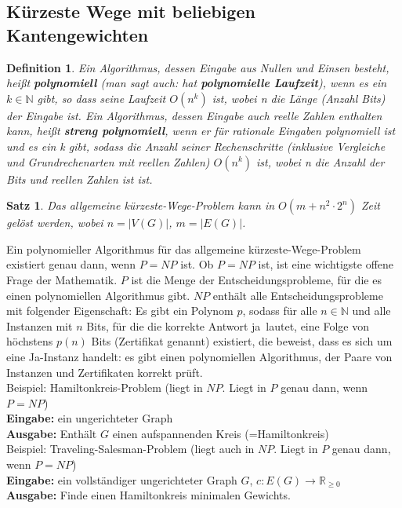 \documentclass[12pt,a4paper]{article}
\theoremstyle{plain}
\newtheorem{Satz}[Theorem]{Satz}
\newtheorem{Definition}[Theorem]{Definition}
\newcommand{\herv}[1]{{\emph{\textbf{#1}}}}
\newcommand{\N}{\mathbb{N}}
\newcommand{\R}{\mathbb{R}}
\numberwithin{equation}{section}
\begin{document}
\subsection{Kürzeste Wege mit beliebigen Kantengewichten}
\begin{Definition}
Ein Algorithmus, dessen Eingabe aus Nullen und Einsen besteht, heißt \herv{polynomiell} (man sagt auch: hat \herv{polynomielle Laufzeit}), wenn es ein $k\in \N$ gibt, so dass seine Laufzeit $O(n^k)$ ist, wobei n die Länge (Anzahl Bits) der Eingabe ist. Ein Algorithmus, dessen Eingabe auch reelle Zahlen enthalten kann, heißt \herv{streng polynomiell}, wenn er für rationale Eingaben polynomiell ist und es ein k gibt, sodass die Anzahl seiner Rechenschritte (inklusive Vergleiche und Grundrechenarten mit reellen Zahlen) $O(n^k)$ ist, wobei n die Anzahl der Bits und reellen Zahlen ist ist.
\end{Definition}
\begin{Satz}
Das allgemeine kürzeste-Wege-Problem kann in $O(m+n^2\cdot 2^n)$ Zeit gelöst werden, wobei $n=|V(G)|$, $m=|E(G)|$.
\end{Satz}
Ein polynomieller Algorithmus für das allgemeine kürzeste-Wege-Problem existiert genau dann, wenn $P=NP$ ist. Ob $P=NP$ ist, ist eine wichtigste offene Frage der Mathematik. $P$ ist die Menge der Entscheidungsprobleme, für die es einen polynomiellen Algorithmus gibt. $NP$ enthält alle Entscheidungsprobleme mit folgender Eigenschaft: Es gibt ein Polynom $p$, sodass für alle $n\in \N$ und alle Instanzen mit $n$ Bits, für die die korrekte Antwort \glqq ja\grqq\ lautet, eine Folge von höchstens $p(n)$ Bits (Zertifikat genannt) existiert, die \glqq beweist\grqq, dass es sich um eine Ja-Instanz handelt: es gibt einen polynomiellen Algorithmus, der Paare von Instanzen und Zertifikaten korrekt prüft.\\
Beispiel: Hamiltonkreis-Problem (liegt in $NP$. Liegt in $P$ genau dann, wenn $P=NP$)\\
\textbf{Eingabe:} ein ungerichteter Graph\\
\textbf{Ausgabe:} Enthält $G$ einen aufspannenden Kreis (=Hamiltonkreis)\\
Beispiel: Traveling-Salesman-Problem (liegt auch in $NP$. Liegt in $P$ genau dann, wenn $P=NP$)\\
\textbf{Eingabe:} ein vollständiger ungerichteter Graph $G$, $c:E(G)\rightarrow \R_{\geq 0}$\\
\textbf{Ausgabe:} Finde einen Hamiltonkreis minimalen Gewichts.
\end{document}
